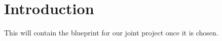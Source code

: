 
\chapter*{Introduction}

This will contain the blueprint for our joint project once it is chosen.







